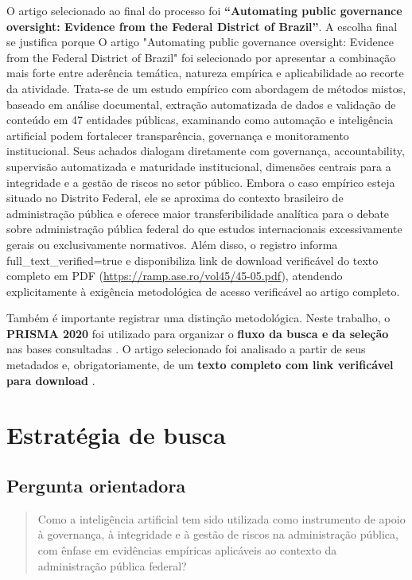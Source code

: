 \documentclass[12pt,a4paper]{article}
\begin{document}
O artigo selecionado ao final do processo foi \textbf{“Automating public governance oversight: Evidence from the Federal District of Brazil”}. A escolha final se justifica porque O artigo "Automating public governance oversight: Evidence from the Federal District of Brazil" foi selecionado por apresentar a combinação mais forte entre aderência temática, natureza empírica e aplicabilidade ao recorte da atividade. Trata-se de um estudo empírico com abordagem de métodos mistos, baseado em análise documental, extração automatizada de dados e validação de conteúdo em 47 entidades públicas, examinando como automação e inteligência artificial podem fortalecer transparência, governança e monitoramento institucional. Seus achados dialogam diretamente com governança, accountability, supervisão automatizada e maturidade institucional, dimensões centrais para a integridade e a gestão de riscos no setor público. Embora o caso empírico esteja situado no Distrito Federal, ele se aproxima do contexto brasileiro de administração pública e oferece maior transferibilidade analítica para o debate sobre administração pública federal do que estudos internacionais excessivamente gerais ou exclusivamente normativos. Além disso, o registro informa full\_text\_verified=true e disponibiliza link de download verificável do texto completo em PDF (\url{https://ramp.ase.ro/vol45/45-05.pdf}), atendendo explicitamente à exigência metodológica de acesso verificável ao artigo completo.

Também é importante registrar uma distinção metodológica. Neste trabalho, o \textbf{PRISMA 2020} foi utilizado para organizar o \textbf{fluxo da busca e da seleção} nas bases consultadas \autocite{prisma2020statement}. O artigo selecionado foi analisado a partir de seus metadados e, obrigatoriamente, de um \textbf{texto completo com link verificável para download} \autocite{freire2025automating}.

\section{Estratégia de busca}
\label{sec:org4fc0624}

\subsection{Pergunta orientadora}
\label{sec:orgba9109e}

\begin{quote}
Como a inteligência artificial tem sido utilizada como instrumento de apoio à governança, à integridade e à gestão de riscos na administração pública, com ênfase em evidências empíricas aplicáveis ao contexto da administração pública federal?
\end{quote}
\end{document}
